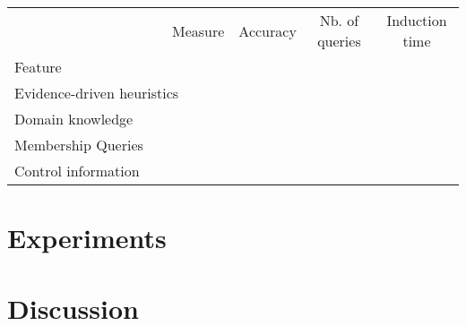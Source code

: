 \begin{table}[h]
\renewcommand{\arraystretch}{1.3}
\begin{center}
\begin{tabular}{| l || c | c | c |}
\hline
~~~~~~~~~~~~~~~~~~~~~~Measure & Accuracy &   Nb. of queries  & Induction time\\
Feature                       &          &                   &               \\
\hline
\hline
Evidence-driven heuristics    &          &                   &               \\
Domain knowledge              &          &                   &               \\
Membership Queries            &          & \cellcolor[gray]{0.7}        &               \\
Control information           &          &                   &               \\
\hline
\end{tabular}
\end{center}
\caption{}
\end{table}


\section{Experiments\label{section:evaluation-action}}

\section{Discussion\label{section:evaluation-discussion}}
